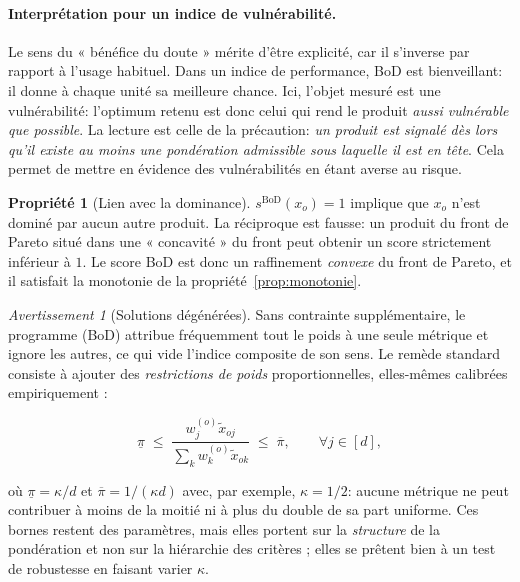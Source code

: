 \documentclass[11pt,a4paper]{article}
\theoremstyle{definition}
\newtheorem{propriete}{Propriété}[section]
\theoremstyle{remark}
\newtheorem{avertissement}{Avertissement}[section]
\begin{document}
\paragraph{Interprétation pour un indice de vulnérabilité.} Le sens du « bénéfice du doute »
mérite d'être explicité, car il s'inverse par rapport à l'usage habituel. Dans un indice de
performance, BoD est bienveillant: il donne à chaque unité sa meilleure chance. Ici, l'objet
mesuré est une vulnérabilité: l'optimum retenu est donc celui qui rend le produit \emph{aussi
vulnérable que possible}. La lecture est celle de la précaution: \emph{un produit est signalé
dès lors qu'il existe au moins une pondération admissible sous laquelle il est en tête}. Cela permet de mettre en évidence des vulnérabilités en étant averse au risque.

\bigskip

\begin{propriete}[Lien avec la dominance]
  $s^{\mathrm{BoD}}(x_o) = 1$ implique que $x_o$ n'est dominé par aucun autre produit. La réciproque
  est fausse: un produit du front de Pareto situé dans une « concavité » du front peut obtenir un
  score strictement inférieur à $1$. Le score BoD est donc un raffinement \emph{convexe} du front de
  Pareto, et il satisfait la monotonie de la propriété~\ref{prop:monotonie}.
\end{propriete}

\begin{avertissement}[Solutions dégénérées]
  Sans contrainte supplémentaire, le programme (BoD) attribue fréquemment tout le poids à une seule
  métrique et ignore les autres, ce qui vide l'indice
  composite de son sens. Le remède standard consiste à ajouter des \emph{restrictions de poids}
  proportionnelles, elles-mêmes calibrées empiriquement :

  \medskip

  \[
  \underline{\pi} \;\le\; \frac{w^{(o)}_j \tilde{x}_{oj}}{\sum_{k} w^{(o)}_k \tilde{x}_{ok}} \;\le\; \overline{\pi},
  \qquad \forall j \in [d],
  \]

  \bigskip

  où $\underline{\pi} = \kappa/d$ et $\overline{\pi} = 1/(\kappa d)$ avec, par exemple,
  $\kappa = 1/2$: aucune métrique ne peut contribuer à moins de la moitié ni à plus du double de sa
  part uniforme. Ces bornes restent des paramètres, mais elles portent sur la \emph{structure} de la
  pondération et non sur la hiérarchie des critères ; elles se prêtent bien à un test de robustesse
  en faisant varier $\kappa$.
\end{avertissement}
\end{document}

